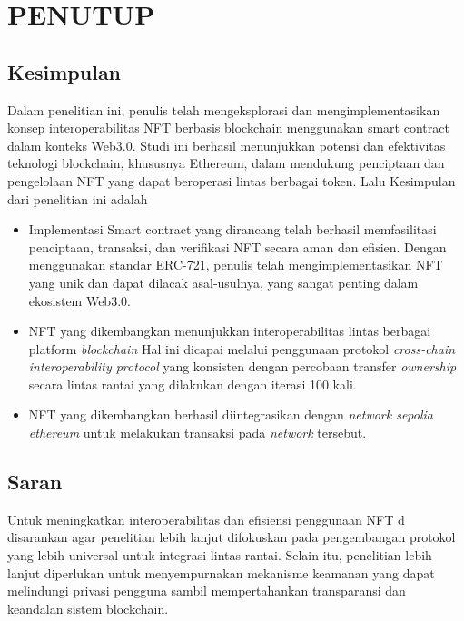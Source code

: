 \chapter{PENUTUP}
\label{chap:penutup}


\section{Kesimpulan}
\label{sec:kesimpulan}

Dalam penelitian ini, penulis telah mengeksplorasi dan mengimplementasikan konsep interoperabilitas NFT berbasis blockchain menggunakan smart contract dalam konteks Web3.0. Studi ini berhasil menunjukkan potensi dan efektivitas teknologi blockchain, khususnya Ethereum, dalam mendukung penciptaan dan pengelolaan NFT yang dapat beroperasi lintas berbagai token. Lalu Kesimpulan dari penelitian ini adalah
\begin{itemize}
\item Implementasi Smart contract yang dirancang telah berhasil memfasilitasi penciptaan, transaksi, dan verifikasi NFT secara aman dan efisien. Dengan menggunakan standar ERC-721, penulis telah mengimplementasikan NFT yang unik dan dapat dilacak asal-usulnya, yang sangat penting dalam ekosistem Web3.0.
\item NFT yang dikembangkan menunjukkan interoperabilitas lintas berbagai platform \emph{blockchain} Hal ini dicapai melalui penggunaan protokol \emph{cross-chain interoperability protocol} yang konsisten dengan percobaan transfer \emph{ownership} secara lintas rantai yang dilakukan dengan iterasi 100 kali.  
\item NFT yang dikembangkan berhasil diintegrasikan dengan \emph{network sepolia ethereum} untuk melakukan transaksi pada \emph{network} tersebut. 
\end{itemize}

\section{Saran}
Untuk meningkatkan interoperabilitas dan efisiensi penggunaan NFT d disarankan agar penelitian lebih lanjut difokuskan pada pengembangan protokol yang lebih universal untuk integrasi lintas rantai. Selain itu, penelitian lebih lanjut diperlukan untuk menyempurnakan mekanisme keamanan yang dapat melindungi privasi pengguna sambil mempertahankan transparansi dan keandalan sistem blockchain.